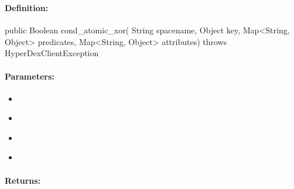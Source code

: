 \subsubsection{}
\label{api:java:cond_atomic_xor}


\paragraph{Definition:}
\begin{javacode}
public Boolean cond_atomic_xor(
        String spacename,
        Object key,
        Map<String, Object> predicates,
        Map<String, Object> attributes) throws HyperDexClientException
\end{javacode}

\paragraph{Parameters:}
\begin{itemize}[noitemsep]
\item {}\\

\item {}\\

\item {}\\

\item {}\\

\end{itemize}

\paragraph{Returns:}


\pagebreak
\subsubsection{}
\label{api:java:async_cond_atomic_xor}


